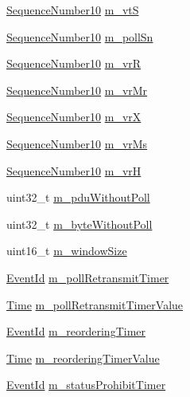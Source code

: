 \begin{DoxyCompactItemize}
\item 
\hyperlink{classns3_1_1SequenceNumber10}{Sequence\+Number10} \hyperlink{classns3_1_1LteRlcAm_a4efc8184c7973cb7b7c896ed514a7b06}{m\+\_\+vtS}
\item 
\hyperlink{classns3_1_1SequenceNumber10}{Sequence\+Number10} \hyperlink{classns3_1_1LteRlcAm_a525db2ac020a1fafe5bc305799a80ae2}{m\+\_\+poll\+Sn}
\item 
\hyperlink{classns3_1_1SequenceNumber10}{Sequence\+Number10} \hyperlink{classns3_1_1LteRlcAm_aeec4bcfab747723421c68ed38feea081}{m\+\_\+vrR}
\item 
\hyperlink{classns3_1_1SequenceNumber10}{Sequence\+Number10} \hyperlink{classns3_1_1LteRlcAm_a19fa34df429b9b277b610ae1d8df0005}{m\+\_\+vr\+Mr}
\item 
\hyperlink{classns3_1_1SequenceNumber10}{Sequence\+Number10} \hyperlink{classns3_1_1LteRlcAm_aafbeed1507367d3bcb51a3a5f7d3aa57}{m\+\_\+vrX}
\item 
\hyperlink{classns3_1_1SequenceNumber10}{Sequence\+Number10} \hyperlink{classns3_1_1LteRlcAm_a474fc32f3d26bb6762782e8fd7e01c60}{m\+\_\+vr\+Ms}
\item 
\hyperlink{classns3_1_1SequenceNumber10}{Sequence\+Number10} \hyperlink{classns3_1_1LteRlcAm_a3a0c74b91caa26ab508b4627c703bc1e}{m\+\_\+vrH}
\item 
uint32\+\_\+t \hyperlink{classns3_1_1LteRlcAm_ac7d9ac8a68b2b0ee696d217031df6b6b}{m\+\_\+pdu\+Without\+Poll}
\item 
uint32\+\_\+t \hyperlink{classns3_1_1LteRlcAm_abb7cacf0298d8cd90355cbe2a0ef4afd}{m\+\_\+byte\+Without\+Poll}
\item 
uint16\+\_\+t \hyperlink{classns3_1_1LteRlcAm_a2c1a56eda5de4f0b8039117cd3af7c67}{m\+\_\+window\+Size}
\item 
\hyperlink{classns3_1_1EventId}{Event\+Id} \hyperlink{classns3_1_1LteRlcAm_a9b34f6f4c6993ae026b95be1f63aacfa}{m\+\_\+poll\+Retransmit\+Timer}
\item 
\hyperlink{classns3_1_1Time}{Time} \hyperlink{classns3_1_1LteRlcAm_ad007e35ba39e42ed6438d9a15c9e31df}{m\+\_\+poll\+Retransmit\+Timer\+Value}
\item 
\hyperlink{classns3_1_1EventId}{Event\+Id} \hyperlink{classns3_1_1LteRlcAm_adfc371376cf9dc771d2b2736be16550c}{m\+\_\+reordering\+Timer}
\item 
\hyperlink{classns3_1_1Time}{Time} \hyperlink{classns3_1_1LteRlcAm_a85886ad772e91a05ee0090a3bab3e343}{m\+\_\+reordering\+Timer\+Value}
\item 
\hyperlink{classns3_1_1EventId}{Event\+Id} \hyperlink{classns3_1_1LteRlcAm_af32da019a7f906fd00bba0f15927817a}{m\+\_\+status\+Prohibit\+Timer}

\end{DoxyCompactItemize}
